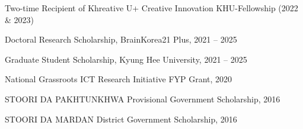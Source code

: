 \documentclass[10pt]{article}
\begin{document}
\begin{mylist}

\item

Two-time Recipient of Khreative U+ Creative Innovation KHU-Fellowship (2022 \& 2023)

\item

Doctoral Research Scholarship, BrainKorea21 Plus, 2021 -- 2025

\item

Graduate Student Scholarship, Kyung Hee University, 2021 --
2025

\item 
National Grassroots ICT Research Initiative FYP Grant, 2020 

\item 
STOORI DA PAKHTUNKHWA Provisional Government Scholarship, 2016

\item 
STOORI DA MARDAN District Government Scholarship, 2016




\end{mylist}



\end{document}
